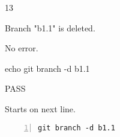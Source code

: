 \begin{description}[align=right,leftmargin=3.2cm,labelindent=3.0cm]
\item[Step:] 13
\item[Confirm:] Branch "b1.1" is deleted.
\item[Expectation:] No error.
\item[Command:] echo git  branch -d b1.1
\item[Test Result:] PASS
\item[Evidence:] Starts on next line.
\end{description}
\begin{lstlisting}[numbers=left]
git branch -d b1.1

\end{lstlisting}
